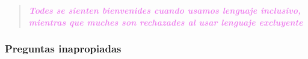 \documentclass[12pt,openany]{book}
\begin{document}
\begin{figure}[h]
    \centering
\end{figure}

\begin{quote}
\centering
\doublespacing
\textit{\Large \textcolor{violet}{\textbf{Todes se sienten bienvenides cuando usamos lenguaje inclusivo, mientras que muches son rechazades al usar lenguaje excluyente}}}
\end{quote}


\begin{figure}[h]
    \centering
\end{figure}

\subsubsection*{Preguntas inapropiadas}
\end{document}
